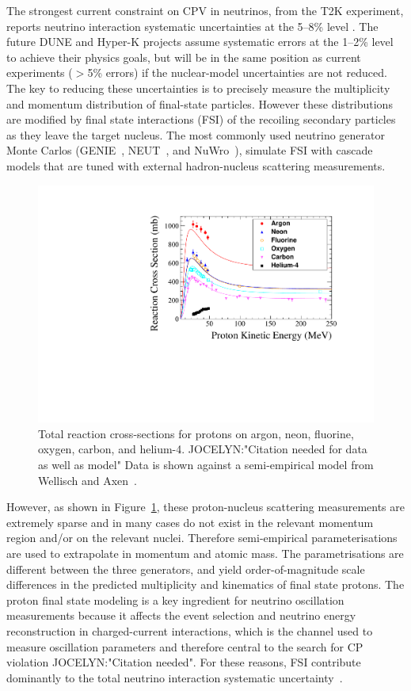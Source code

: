 The strongest current constraint on CPV in neutrinos, from the T2K experiment, reports neutrino interaction systematic uncertainties at the 5--8\% level \cite{Abe:2018wpn}.
The future DUNE and Hyper-K projects assume systematic errors at the 1--2\% level to achieve their physics goals, but will be in the same position as current experiments ($>$5\% errors) if the nuclear-model uncertainties are not reduced.  
The key to reducing these uncertainties is to precisely measure the multiplicity and momentum distribution of final-state particles. 
However these distributions are modified by final state interactions (FSI) of the recoiling secondary particles as they leave the target nucleus.  
The most commonly used neutrino generator Monte Carlos (GENIE~\cite{Andreopoulos:2009rq}, NEUT~\cite{Hayato:2009zz}, and NuWro~\cite{GOLAN2012499}), simulate FSI with cascade models that are tuned with external hadron-nucleus scattering measurements.
\begin{figure}%
    \centering
    \includegraphics[width=12cm]{files/Figures/DataProtonCrossSections.pdf}%
    \caption{Total reaction cross-sections for protons on  argon, neon, fluorine, oxygen, carbon, and helium-4. JOCELYN:"Citation needed for data as well as model" Data is shown against a semi-empirical model from Wellisch and Axen~\cite{wellisch1996total}.}
    \label{fig:DataProtonXSec}%
\end{figure}

However, as shown in Figure~\ref{fig:DataProtonXSec}, these proton-nucleus scattering measurements are extremely sparse and in many cases do not exist in the relevant momentum region and/or on the relevant nuclei.
Therefore semi-empirical parameterisations are used to extrapolate in momentum and atomic mass.  
The parametrisations are different between the three generators, and yield order-of-magnitude scale differences in the predicted multiplicity and kinematics of final state protons.
The proton final state modeling is a key ingredient for neutrino oscillation measurements because it affects the event selection and neutrino energy reconstruction in charged-current interactions, which is the channel used to measure oscillation parameters and therefore central to the search for CP violation JOCELYN:"Citation needed".  
For these reasons, FSI contribute dominantly to the total neutrino interaction systematic uncertainty~\cite{Abe:2018wpn}.

